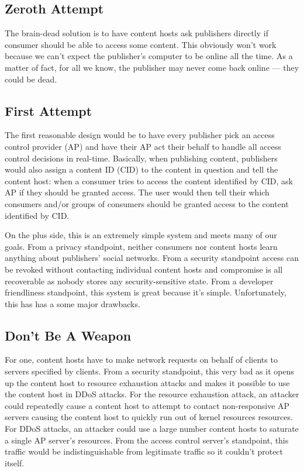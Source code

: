 \documentclass[pdftex,12pt,a4papaer]{report}
\begin{document}
\subsection{Zeroth Attempt}

The brain-dead solution is to have content hosts ask publishers directly if
consumer should be able to access some content. This obviously won't work
because we can't expect the publisher's computer to be online all the time. As a
matter of fact, for all we know, the publisher may never come back online ---
they could be dead.

\subsection{First Attempt}

The first reasonable design would be to have every publisher pick an access
control provider (AP) and have their AP act their behalf to handle all access
control decisions in real-time. Basically, when publishing content, publishers
would also assign a content ID (CID) to the content in question and tell the
content host: when a consumer tries to access the content identified by CID, ask
AP if they should be granted access. The user would then tell their which
consumers and/or groups of consumers should be granted access to the content
identified by CID.

On the plus side, this is an extremely simple system and meets many of our
goals. From a privacy standpoint, neither consumers nor content hosts learn
anything about publishers' social networks. From a security standpoint access
can be revoked without contacting individual content hosts and compromise 
is all recoverable as nobody stores any security-sensitive state. From a
developer friendliness standpoint, this system is great because it's simple.
Unfortunately, this has has a some major drawbacks.

\subsection{Don't Be A Weapon}

For one, content hosts have to make network requests on behalf of clients to
servers specified by clients. From a security standpoint, this very bad as it
opens up the content host to resource exhaustion attacks and makes it possible
to use the content host in DDoS attacks. For the resource exhaustion attack, an
attacker could repeatedly cause a content host to attempt to contact
non-responsive AP servers causing the content host to quickly run out of kernel
resources resources. For DDoS attacks, an attacker could use a large number
content hosts to saturate a single AP server's resources. From the access
control server's standpoint, this traffic would be indistinguishable from
legitimate traffic so it couldn't protect itself.
\end{document}

